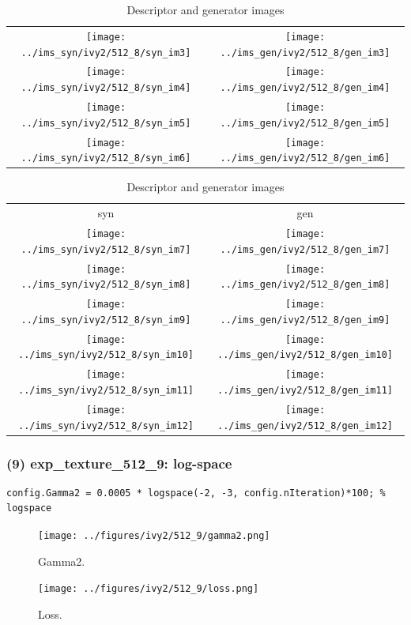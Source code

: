 \documentclass[letter]{article}
\begin{document}
\begin{table}[h!]
\begin{tabular}{cc}
		\texttt{[image: ../ims\_syn/ivy2/512\_8/syn\_im3]} & \texttt{[image: ../ims\_gen/ivy2/512\_8/gen\_im3]} \tabularnewline
		\texttt{[image: ../ims\_syn/ivy2/512\_8/syn\_im4]} & \texttt{[image: ../ims\_gen/ivy2/512\_8/gen\_im4]} \tabularnewline
		\texttt{[image: ../ims\_syn/ivy2/512\_8/syn\_im5]} & \texttt{[image: ../ims\_gen/ivy2/512\_8/gen\_im5]} \tabularnewline
		\texttt{[image: ../ims\_syn/ivy2/512\_8/syn\_im6]} & \texttt{[image: ../ims\_gen/ivy2/512\_8/gen\_im6]} \tabularnewline
	\end{tabular}
	\begin{tabular}{cc}
		syn & gen\tabularnewline
		\texttt{[image: ../ims\_syn/ivy2/512\_8/syn\_im7]} & \texttt{[image: ../ims\_gen/ivy2/512\_8/gen\_im7]} \tabularnewline
		\texttt{[image: ../ims\_syn/ivy2/512\_8/syn\_im8]} & \texttt{[image: ../ims\_gen/ivy2/512\_8/gen\_im8]} \tabularnewline
		\texttt{[image: ../ims\_syn/ivy2/512\_8/syn\_im9]} & \texttt{[image: ../ims\_gen/ivy2/512\_8/gen\_im9]} \tabularnewline
		\texttt{[image: ../ims\_syn/ivy2/512\_8/syn\_im10]} & \texttt{[image: ../ims\_gen/ivy2/512\_8/gen\_im10]} \tabularnewline
		\texttt{[image: ../ims\_syn/ivy2/512\_8/syn\_im11]} & \texttt{[image: ../ims\_gen/ivy2/512\_8/gen\_im11]} \tabularnewline
		\texttt{[image: ../ims\_syn/ivy2/512\_8/syn\_im12]} & \texttt{[image: ../ims\_gen/ivy2/512\_8/gen\_im12]} \tabularnewline
	\end{tabular}
	\caption{Descriptor and generator images}
\end{table}
\newpage

\subsubsection*{(9) exp\_texture\_512\_9: log-space}

\begin{lstlisting}
config.Gamma2 = 0.0005 * logspace(-2, -3, config.nIteration)*100; % logspace
\end{lstlisting}

\begin{figure}[h!]
	\centering
	\texttt{[image: ../figures/ivy2/512\_9/gamma2.png]}
	\caption{\label{fig:gamma1}Gamma2.}
\end{figure}

\begin{figure}[h!]
	\centering
	\texttt{[image: ../figures/ivy2/512\_9/loss.png]}
	\caption{\label{fig:gamma1}Loss.}
\end{figure}

\newpage
\end{document}
